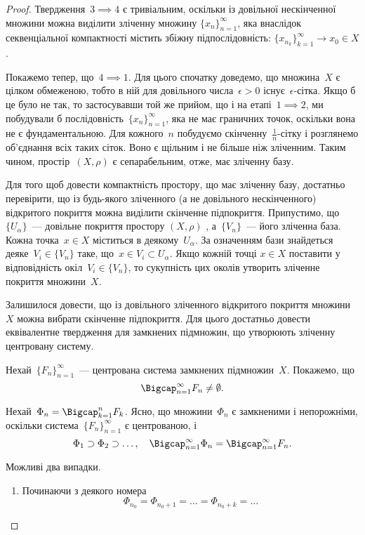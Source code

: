 \begin{proof}
Твердження~$3 \implies 4$ є тривіальним, оскільки із довільної
нескінченної множини можна виділити зліченну множину
$\{x_n\}_{n = 1}^\infty$, яка внаслідок секвенціальної компактності містить
збіжну підпослідовність: $\{x_{n_k}\}_{k = 1}^\infty \to x_0 \in X$.

Покажемо тепер, що~$4 \implies 1$. Для цього спочатку
доведемо, що множина~$X$ є цілком обмеженою, тобто в ній
для довільного числа~$\epsilon > 0$ існує~$\epsilon$-сітка. Якщо б це було не
так, то застосувавши той же прийом, що і на етапі~$1 \implies 2$, ми
побудували б послідовність~$\{x_n\}_{n = 1}^\infty$, яка не має граничних
точок, оскільки вона не є фундаментальною. Для кожного~$n$
побудуємо скінченну~$\frac{1}{n}$-сітку і розглянемо об’єднання всіх
таких сіток. Воно є щільним і не більше ніж зліченним.
Таким чином, простір~$(X, \rho)$ є сепарабельним, отже, має
зліченну базу.

Для того щоб довести компактність простору, що має
зліченну базу, достатньо перевірити, що із будь-якого
зліченного (а не довільного нескінченного) відкритого
покриття можна виділити скінченне підпокриття.
Припустимо, що~$\{U_\alpha\}$~--- довільне покриття простору
$(X, \rho)$ , а~$\{V_n\}$~--- його зліченна база. Кожна точка~$x \in X$
міститься в деякому~$U_\alpha$. За означенням бази знайдеться
деяке~$V_i \in \{V_n\}$ таке, що~$x \in V_i \subset U_\alpha$. Якщо кожній точці
$x \in X$ поставити у відповідність окіл~$V_i \in \{V_n\}$, то
сукупність цих околів утворить зліченне покриття
множини~$X$.

Залишилося довести, що із довільного зліченного
відкритого покриття множини~$X$ можна вибрати скінченне
підпокриття. Для цього достатньо довести еквівалентне
твердження для замкнених підмножин, що утворюють
зліченну центровану систему.

Нехай~$\{F_n\}_{n = 1}^\infty$~--- центрована система замкнених
підмножин~$X$. Покажемо, що
\begin{equation*}
    \Bigcap_{n = 1}^\infty F_n \ne \emptyset.
\end{equation*}

Нехай~$\Phi_n = \Bigcap_{k = 1}^n F_k$. Ясно, що множини~$\Phi_n$ є замкненими і
непорожніми, оскільки система~$\{F_n\}_{n = 1}^\infty$ є центрованою, і
\begin{equation*}
    \Phi_1 \supset \Phi_2 \supset \dots, \quad
    \Bigcap_{n = 1}^\infty \Phi_n = \Bigcap_{n = 1}^\infty F_n.    
\end{equation*}

Можливі два випадки.
\begin{enumerate}
\item Починаючи з деякого номера
\begin{equation*}
    \Phi_{n_0} = \Phi_{n_0 + 1} = \dots = \Phi_{n_0 + k} = \dots
\end{equation*}


\end{enumerate}
\end{proof}

